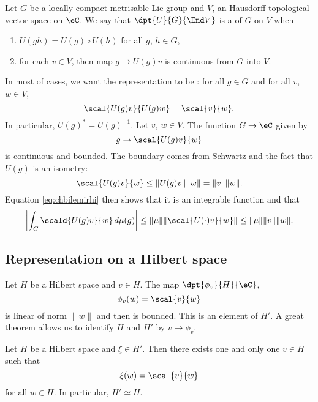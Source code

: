 Let $G$ be a locally compact metrisable Lie group and $V$, an Hausdorff topological vector space on $\eC$. We say that $\dpt{U}{G}{\End V}$ is a  of $G$ on $V$ when
\begin{enumerate}
	\item $U(gh)=U(g)\circ U(h)$ for all $g$, $h\in G$,
	\item for each $v\in V$, then map $g\to U(g)v$ is continuous from $G$ into $V$.
\end{enumerate}
In most of cases, we want the representation to be : for all $g\in G$ and for all $v$, $w\in V$,
\begin{equation}
	\scal{U(g)v}{U(g)w}=\scal{v}{w}.
\end{equation}
In particular, $U(g)^*=U(g)^{-1}$. Let $v$, $w\in V$. The function $G\to\eC$ given by
\[
	g\to \scal{U(g)v}{w}
\]
is continuous and bounded. The boundary comes from Schwartz and the fact that $U(g)$ is an isometry:
\begin{equation}
	\scal{U(g)v}{w}\leq \| U(g)v \|\| w \|
	=\| v \|\| w \|.
\end{equation}
Equation \eqref{eq:chbilemirhi} then shows that it is an integrable function and that
\begin{equation} \label{eq:Tmuvborn}
	\left|    \int_G\scald{U(g)v}{w}\,d\mu(g)   \right|\leq\| \mu \|\| \scal{U(\cdot)v}{w} \|
	\leq \| \mu \|\| v \|\| w \|.
\end{equation}

\subsection{Representation on a Hilbert space}

Let $H$ be a Hilbert space and $v\in H$. The map $\dpt{\phi_v}{H}{\eC}$,
\[
	\phi_v(w)=\scal{v}{w}
\]
is linear of norm $\| w \|$ and then is bounded. This is an element of $H'$. A great theorem allows us to identify $H$ and $H'$ by $v\to\phi_v$.

\begin{theorem}
	Let $H$ be a Hilbert space and $\xi\in H'$. Then there exists one and only one $v\in H$ such that
	\[
		\xi(w)=\scal{v}{w}
	\]
	for all $w\in H$. In particular, $H'\simeq H$.
\end{theorem}

